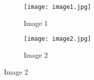 \documentclass{article}
\begin{document}
\begin{figure}[h]
\centering
\begin{subfigure}{0.46\linewidth}
\texttt{[image: image1.jpg]}
\caption{Image 1}
\label{fig:subfig1}
\end{subfigure}
\hfill
\begin{subfigure}{0.44\linewidth}
\texttt{[image: image2.jpg]}
\caption{Image 2}
\label{fig:subfig2}
\end{subfigure}
\end{figure}
\end{document}
